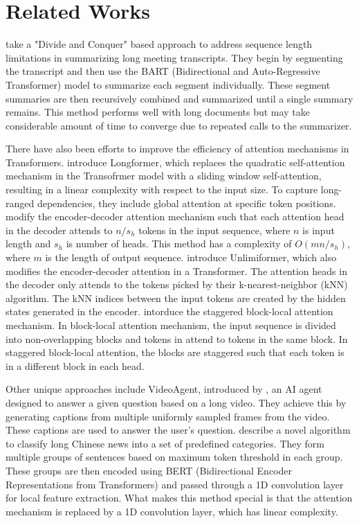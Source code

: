 \section{Related Works}
\label{sec:related-works}

\citet{golia2024action} take a "Divide and Conquer" based approach to address
sequence length limitations in summarizing long meeting transcripts.
They begin by segmenting the transcript and then use the BART (Bidirectional and
Auto-Regressive Transformer) model to summarize each segment individually.
These segment summaries are then recursively combined and summarized until a single
summary remains.
This method performs well with long documents but may take considerable amount of time
to converge due to repeated calls to the summarizer.

There have also been efforts to improve the efficiency of attention mechanisms in Transformers.
\citet{beltagy2020longformer} introduce Longformer, which replaces the quadratic
self-attention mechanism in the Transofrmer model with a sliding window self-attention,
resulting in a linear complexity with respect to the input size.
To capture long-ranged dependencies, they include global attention at specific token positions.
\citet{huang-etal-2021-efficient} modify the encoder-decoder attention mechanism such that
each attention head in the decoder attends to $n/s_h$ tokens in the input sequence, where
$n$ is input length and $s_h$ is number of heads.
This method has a complexity of $O(mn/s_h)$, where $m$ is the length of output sequence.
\citet{bertsch2023unlimiformer} introduce Unlimiformer, which also modifies the encoder-decoder
attention in a Transformer.
The attention heads in the decoder only attends to the tokens picked by their
k-nearest-neighbor (kNN) algorithm.
The kNN indices between the input tokens are created by the hidden states generated in the
encoder.
\citet{phang2022investigating} intorduce the staggered block-local attention mechanism.
In block-local attention mechanism, the input sequence is divided into non-overlapping blocks
and tokens in attend to tokens in the same block.
In staggered block-local attention, the blocks are staggered such that each token is in a
different block in each head.

Other unique approaches include VideoAgent, introduced by \citet{wang2024videoagent}, an
AI agent designed to answer a given question based on a long video.
They achieve this by generating captions from multiple uniformly sampled frames from the
video.
These captions are used to answer the user's question.
\citet{chen2022long} describe a novel algorithm to classify long Chinese news into a set
of predefined categories.
They form multiple groups of sentences based on maximum token threshold in each group.
These groups are then encoded using BERT (Bidirectional Encoder Representations from
Transformers) and passed through a 1D convolution layer for local feature extraction.
What makes this method special is that the attention mechanism is replaced by a 1D
convolution layer, which has linear complexity.
